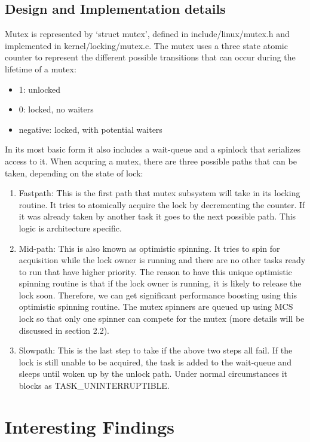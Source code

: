 \documentclass[10pt]{sigplanconf}
\begin{document}
\subsection{Design and Implementation details}
Mutex is represented by ‘struct mutex’, defined in include/linux/mutex.h and implemented in kernel/locking/mutex.c. The mutex uses a three state atomic counter to represent the different possible transitions that can occur during the lifetime of a mutex:
\begin{itemize}
	\item 1: unlocked
	\item 0: locked, no waiters
	\item negative: locked, with potential waiters
\end{itemize}
In its most basic form it also includes a wait-queue and a spinlock that serializes access to it. When acquring a mutex, there are three possible paths that can be taken, depending on the state of lock:
\begin{enumerate}
	\item Fastpath: This is the first path that mutex subsystem will take in its locking routine. It tries to atomically acquire the lock by decrementing the counter. If it was already taken by another task it goes to the next possible path. This logic is architecture specific.
	\item Mid-path: This is also known as optimistic spinning. It tries to spin for acquisition while the lock owner is running and there are no other tasks ready to run that have higher priority. The reason to have this unique optimistic spinning routine is that if the lock owner is running, it is likely to release the lock soon. Therefore, we can get significant performance boosting using this optimistic spinning routine. The mutex spinners are queued up using MCS lock so that only one spinner can compete for the mutex (more details will be discussed in section 2.2). 
	\item Slowpath: This is the last step to take if the above two steps all fail. If the lock is still unable to be acquired, the task is added to the wait-queue and sleeps until woken up by the unlock path. Under normal circumstances it blocks as TASK\_UNINTERRUPTIBLE.
\end{enumerate}

\vspace{50pt}

\section{Interesting Findings}
\end{document}
